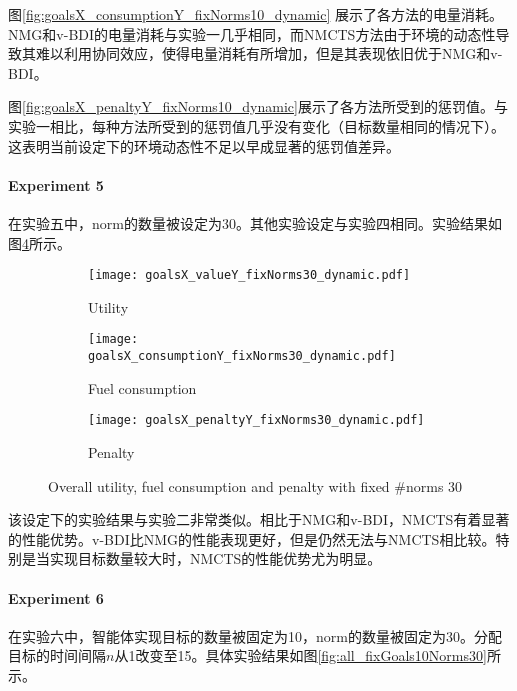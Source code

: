 图\ref{fig:goalsX_consumptionY_fixNorms10_dynamic} 展示了各方法的电量消耗。NMG和v-BDI的电量消耗与实验一几乎相同，而NMCTS方法由于环境的动态性导致其难以利用协同效应，使得电量消耗有所增加，但是其表现依旧优于NMG和v-BDI。

图\ref{fig:goalsX_penaltyY_fixNorms10_dynamic}展示了各方法所受到的惩罚值。与实验一相比，每种方法所受到的惩罚值几乎没有变化（目标数量相同的情况下）。这表明当前设定下的环境动态性不足以早成显著的惩罚值差异。

\vspace{3cm}

\paragraph{Experiment 5}
在实验五中，norm的数量被设定为30。其他实验设定与实验四相同。实验结果如图\ref{fig:all_fixNorms30_dynamic}所示。
\begin{figure}
\centering
\begin{subfigure}{.47\textwidth}
  \centering
  \texttt{[image: goalsX\_valueY\_fixNorms30\_dynamic.pdf]}
  \captionsetup{justification=centering}
  \caption{Utility}
  \label{fig:goalsX_valueY_fixNorms30_dynamic}
\end{subfigure}

\begin{subfigure}{.47\textwidth}
  \centering
  \texttt{[image: goalsX\_consumptionY\_fixNorms30\_dynamic.pdf]}
  \captionsetup{justification=centering}
  \caption{Fuel consumption}
  \label{fig:goalsX_consumptionY_fixNorms30_dynamic}
\end{subfigure}
\begin{subfigure}{.47\textwidth}
  \centering
  \texttt{[image: goalsX\_penaltyY\_fixNorms30\_dynamic.pdf]}
  \captionsetup{justification=centering}
  \caption{Penalty}
  \label{fig:goalsX_penaltyY_fixNorms30_dynamic}
\end{subfigure}
\captionsetup{justification=centering}
\caption{Overall utility, fuel consumption and penalty with fixed \#norms 30}
\label{fig:all_fixNorms30_dynamic}
\end{figure}

该设定下的实验结果与实验二非常类似。相比于NMG和v-BDI，NMCTS有着显著的性能优势。v-BDI比NMG的性能表现更好，但是仍然无法与NMCTS相比较。特别是当实现目标数量较大时，NMCTS的性能优势尤为明显。

\paragraph{Experiment 6}
在实验六中，智能体实现目标的数量被固定为10，norm的数量被固定为30。分配目标的时间间隔$n$从1改变至15。具体实验结果如图\ref{fig:all_fixGoals10Norms30}所示。

